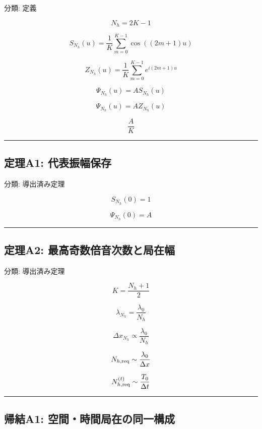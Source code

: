 \documentclass[
  a4paper,
]{ltjsarticle}
\begin{document}
分類: 定義

\[
N_h=2K-1
\]

\[
S_{N_h}(u)=\frac{1}{K}\sum_{m=0}^{K-1}\cos((2m+1)u)
\]

\[
Z_{N_h}(u)=\frac{1}{K}\sum_{m=0}^{K-1}e^{i(2m+1)u}
\]

\[
\Psi_{N_h}(u)=A S_{N_h}(u)
\]

\[
\Psi_{N_h}(u)=A Z_{N_h}(u)
\]

\[
\frac{A}{K}
\]

\begin{center}\rule{0.5\linewidth}{0.5pt}\end{center}

\subsection{定理A1:
代表振幅保存}\label{ux5b9aux7406a1-ux4ee3ux8868ux632fux5e45ux4fddux5b58}

分類: 導出済み定理

\[
S_{N_h}(0)=1
\]

\[
\Psi_{N_h}(0)=A
\]

\begin{center}\rule{0.5\linewidth}{0.5pt}\end{center}

\subsection{定理A2:
最高奇数倍音次数と局在幅}\label{ux5b9aux7406a2-ux6700ux9ad8ux5947ux6570ux500dux97f3ux6b21ux6570ux3068ux5c40ux5728ux5e45}

分類: 導出済み定理

\[
K=\frac{N_h+1}{2}
\]

\[
\lambda_{N_h}=\frac{\lambda_0}{N_h}
\]

\[
\Delta x_{N_h}\propto\frac{\lambda_0}{N_h}
\]

\[
N_{h,\rm req}\sim\frac{\lambda_0}{\Delta x}
\]

\[
N_{h,\rm req}^{(t)}\sim\frac{T_0}{\Delta t}
\]

\begin{center}\rule{0.5\linewidth}{0.5pt}\end{center}

\subsection{帰結A1:
空間・時間局在の同一構成}\label{ux5e30ux7d50a1-ux7a7aux9593ux6642ux9593ux5c40ux5728ux306eux540cux4e00ux69cbux6210}
\end{document}
